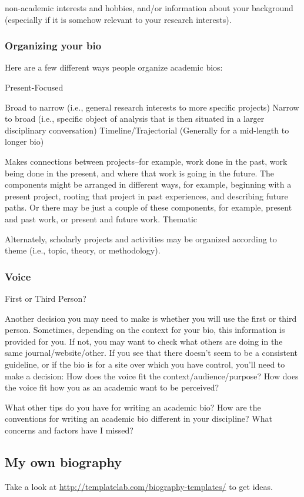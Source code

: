 non-academic interests and hobbies, and/or
information about your background (especially if it is somehow relevant to your research interests).

\subsubsection{Organizing your bio}

Here are a few different ways people organize academic bios:

Present-Focused

Broad to narrow (i.e., general research interests to more specific projects)
Narrow to broad (i.e., specific object of analysis that is then situated in a larger disciplinary conversation)
Timeline/Trajectorial (Generally for a mid-length to longer bio)

Makes connections between projects–for example, work done in the past, work being done in the present, and where that work is going in the future. The components might be arranged in different ways, for example, beginning with a present project, rooting that project in past experiences, and describing future paths. Or there may be just a couple of these components, for example, present and past work, or present and future work.
Thematic

Alternately, scholarly projects and activities may be organized according to theme (i.e., topic, theory, or methodology).

\subsubsection{Voice}

First or Third Person?

Another decision you may need to make is whether you will use the first or third person. Sometimes, depending on the context for your bio, this information is provided for you. If not, you may want to check what others are doing in the same journal/website/other. If you see that there doesn't seem to be a consistent guideline, or if the bio is for a site over which you have control, you'll need to make a decision: How does the voice fit the context/audience/purpose? How does the voice fit how you as an academic want to be perceived?

What other tips do you have for writing an academic bio? How are the conventions for writing an academic bio different in your discipline? What concerns and factors have I missed?

\subsection{My own biography}

Take a look at \url{http://templatelab.com/biography-templates/} to get ideas.
